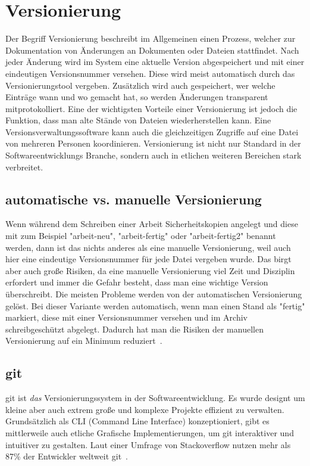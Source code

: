 \section{Versionierung}
Der Begriff Versionierung beschreibt im Allgemeinen einen Prozess, welcher zur Dokumentation von Änderungen an Dokumenten oder Dateien stattfindet.
Nach jeder Änderung wird im System eine aktuelle Version abgespeichert und mit einer eindeutigen Versionsnummer versehen.
Diese wird meist automatisch durch das Versionierungstool vergeben.
Zusätzlich wird auch gespeichert, wer welche Einträge wann und wo gemacht hat, so werden Änderungen transparent mitprotokolliert.
Eine der wichtigsten Vorteile einer Versionierung ist jedoch die Funktion, dass man alte Stände von Dateien wiederherstellen kann.
Eine Versionsverwaltungssoftware kann auch die gleichzeitigen Zugriffe auf eine Datei von mehreren Personen koordinieren.
Versionierung ist nicht nur Standard in der Softwareentwicklungs Branche, sondern auch in etlichen weiteren Bereichen stark
verbreitet.

\subsection{automatische vs. manuelle Versionierung}
Wenn während dem Schreiben einer Arbeit Sicherheitskopien angelegt und diese mit zum Beispiel "arbeit-neu",
"arbeit-fertig" oder "arbeit-fertig2" benannt werden, dann ist das nichts anderes als eine manuelle Versionierung, weil auch hier
eine eindeutige Versionsnummer für jede Datei vergeben wurde.
Das birgt aber auch große Risiken, da eine manuelle Versionierung viel Zeit und Disziplin erfordert und immer die Gefahr
besteht, dass man eine wichtige Version überschreibt.
Die meisten Probleme werden von der automatischen Versionierung gelöst.
Bei dieser Variante werden automatisch, wenn man einen Stand als "fertig" markiert, diese mit einer Versionsnummer versehen
und im Archiv schreibgeschützt abgelegt.
Dadurch hat man die Risiken der manuellen Versionierung auf ein Minimum reduziert~\cite{versionierung}.

\subsection{git}
git ist \emph{das} Versionierungssystem in der Softwareentwicklung.
Es wurde designt um kleine aber auch extrem große und komplexe Projekte effizient zu verwalten.
Grundsätzlich als CLI (Command Line Interface) konzeptioniert, gibt es mittlerweile auch etliche Grafische Implementierungen,
um git interaktiver und intuitiver zu gestalten.
Laut einer Umfrage von Stackoverflow nutzen mehr als 87\% der Entwickler weltweit git~\cite{stackoverflow-git-survey}.

